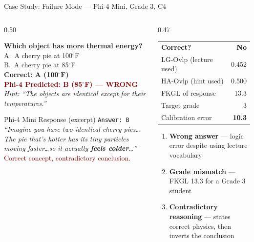 \documentclass[aspectratio=169]{beamer}
\begin{document}
\begin{frame}{Case Study: Failure Mode --- Phi-4 Mini, Grade 3, C4}
\begin{columns}[T]
  \begin{column}{0.50\textwidth}
    
      \textbf{Which object has more thermal energy?}\\[4pt]
      A.~A cherry pie at 100$^\circ$F\\
      B.~A cherry pie at 85$^\circ$F\\[4pt]
      \textcolor{custompurple}{\textbf{Correct: A (100$^\circ$F)}}\\
      \textcolor{darkred}{\textbf{Phi-4 Predicted: B (85$^\circ$F) --- WRONG}}\\[2pt]
      \textit{Hint: ``The objects are identical except for their temperatures.''}
    \vspace{0.2cm}
    \begin{alertblock}{Phi-4 Mini Response (excerpt)}
      \scriptsize
      \texttt{Answer: B}\\[2pt]
      \textit{``Imagine you have two identical cherry pies\ldots The pie that's hotter has its tiny particles moving faster\ldots so it actually \textbf{feels colder}\ldots''}\\[3pt]
      \textcolor{darkred}{Correct concept, contradictory conclusion.}
    \end{alertblock}
  \end{column}
  \begin{column}{0.47\textwidth}
    \vspace{0.1cm}
    \renewcommand{\arraystretch}{1.25}
    \begin{tabular}{lr}
      \textbf{Correct?} & \cellcolor{darkred!20}\textbf{No}\\
      LG-Ovlp (lecture used) & 0.452\\
      HA-Ovlp (hint used)    & 0.500\\
      FKGL of response       & \cellcolor{darkred!20}13.3\\
      Target grade           & 3\\
      Calibration error      & \cellcolor{darkred!20}\textbf{10.3}\\
    \end{tabular}
    
    \begin{enumerate}\itemsep4pt\small
      \item \textbf{Wrong answer} --- logic error despite using lecture vocabulary
      \item \textbf{Grade mismatch} --- FKGL 13.3 for a Grade 3 student 
      \item \textbf{Contradictory reasoning} --- states correct physics, then inverts the conclusion
    \end{enumerate}
    \vspace{0.1cm}
  \end{column}
\end{columns}
\end{frame}
\end{document}
